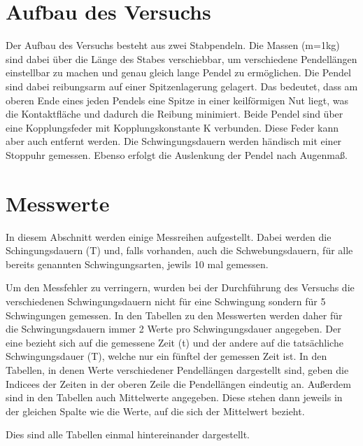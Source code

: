\documentclass[titlepage=firstcover, captions=tableheading]{scrartcl}
\begin{document}
\section{Aufbau des Versuchs}
\noindent Der Aufbau des Versuchs besteht aus zwei Stabpendeln. Die Massen (m=1kg) sind dabei über die Länge des Stabes verschiebbar, um verschiedene Pendellängen einstellbar zu machen und genau gleich lange Pendel zu ermöglichen. Die Pendel sind dabei reibungsarm auf einer Spitzenlagerung gelagert. Das bedeutet, dass am oberen Ende eines jeden Pendels eine Spitze in einer keilförmigen Nut liegt, was die Kontaktfläche und dadurch die Reibung minimiert. Beide Pendel sind über eine Kopplungsfeder mit Kopplungskonstante K verbunden. Diese Feder kann aber auch entfernt werden. Die Schwingungsdauern werden händisch mit einer Stoppuhr gemessen. Ebenso erfolgt die Auslenkung der Pendel nach Augenmaß. 

\section{Messwerte}
In diesem Abschnitt werden einige Messreihen aufgestellt.
Dabei werden die Schingungsdauern (T) und, falls vorhanden, auch die Schwebungsdauern, für alle bereits genannten Schwingungsarten,
jewils 10 mal gemessen.

\noindent Um den Messfehler zu verringern, wurden bei der Durchführung des Versuchs die verschiedenen Schwingungsdauern
nicht für eine Schwingung sondern für 5 Schwingungen gemessen. In den Tabellen zu den Messwerten werden daher für die Schwingungsdauern
immer 2 Werte pro Schwingungsdauer angegeben. Der eine bezieht sich auf die gemessene Zeit (t) und 
der andere auf die tatsächliche Schwingungsdauer (T), welche nur ein fünftel der gemessen Zeit ist.
In den Tabellen, in denen Werte verschiedener Pendellängen dargestellt sind, geben die Indicees der Zeiten in der oberen Zeile die Pendellängen eindeutig an.
Außerdem sind in den Tabellen auch Mittelwerte angegeben. Diese stehen dann jeweils in der gleichen Spalte wie die Werte, auf die sich der Mittelwert bezieht.

\noindent Dies sind alle Tabellen einmal hintereinander dargestellt.
\end{document}
